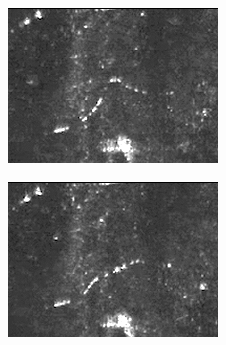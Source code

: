 \documentclass[%
 reprint,
 amsmath,amssymb,
 aps,
 prl,
]{revtex4-2}
\begin{document}
\begin{figure}[t]
\begin{subfigure}[b]{0.24\textwidth}
		\includegraphics*[width=\textwidth]{exp-snap-3.png}
	\end{subfigure}
    \begin{subfigure}[b]{0.24\textwidth}
		\centering
		\includegraphics*[width=\textwidth]{exp-snap-4.png}
	\end{subfigure}
	\hfill
    \vspace{0.5cm}
	\begin{subfigure}[b]{0.24\textwidth}
		\centering

\end{subfigure}
\end{figure}
\end{document}

